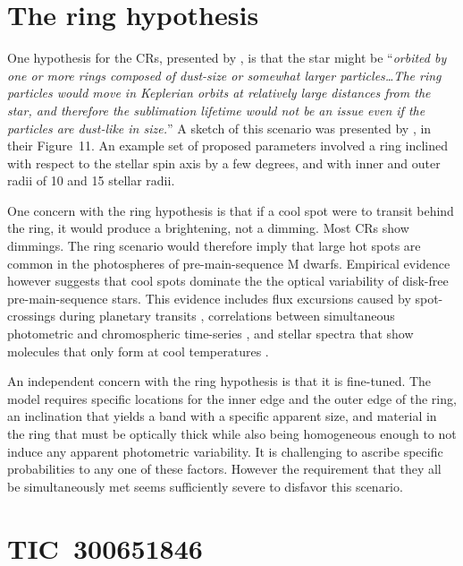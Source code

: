 \documentclass[11pt,twocolumn,tighten]{aastex63}
\begin{document}

\appendix

\section{The ring hypothesis}
\label{app:ring}

One hypothesis for the CRs, presented by \citet{2019ApJ...876..127Z},
is that the star might be ``{\it orbited by one or more rings composed of
dust-size or somewhat larger particles\ldots The ring particles would
move in Keplerian orbits at relatively large distances from the star,
and therefore the sublimation lifetime would not be an issue even if
the particles are dust-like in size.}'' A sketch of this scenario was
presented by \citet{2019ApJ...876..127Z}, in their Figure~11.
An example set of proposed parameters involved a ring inclined with
respect to the stellar spin axis by a few degrees, and with inner and
outer radii of 10 and 15 stellar radii.

One concern with the ring hypothesis is that if a cool spot were to
transit behind the ring, it would produce a brightening, not a
dimming.   Most CRs show dimmings.   The ring scenario would
therefore imply that large hot spots are common in the photospheres of
pre-main-sequence M dwarfs.  Empirical evidence however suggests that
cool spots dominate the
the optical variability of disk-free pre-main-sequence stars.
This evidence includes flux excursions
caused by spot-crossings during planetary transits
\citep[e.g.][]{2020AJ....160...33R,2022AJ....163..147G}, correlations
between simultaneous photometric and chromospheric time-series
\citep{2019A&A...621A..21R}, and stellar spectra that show molecules
that only form at cool temperatures
\citep[e.g.][]{2017ApJ...836..200G,2023ApJ...946...10P}.

An independent  concern with the ring hypothesis is that it is fine-tuned.
The model requires specific locations for the inner edge and the outer
edge of the ring, an inclination that yields a band with a specific
apparent size, and material in the ring that must be optically thick
while also being homogeneous enough to not induce any apparent
photometric variability.
It is challenging to ascribe specific probabilities to any one
of these factors.
However the requirement that they all be simultaneously met seems sufficiently
severe to disfavor this scenario.



\section{TIC~300651846}
\label{app:tic3006}
\end{document}
